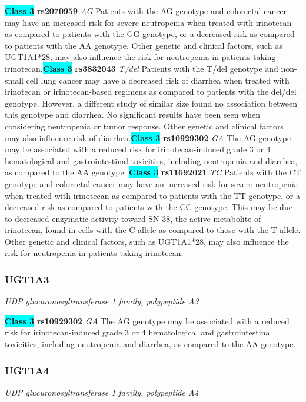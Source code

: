 \documentclass{report}
\begin{document}
\textbf{\colorbox{cyan} {Class 3}} \textbf{ rs2070959 } \textit{ AG }
Patients with the AG genotype and colorectal cancer may have an increased risk for severe neutropenia when treated with irinotecan as compared to patients with the GG genotype, or a decreased risk as compared to patients with the AA genotype. Other genetic and clinical factors, such as UGT1A1*28, may also influence the risk for neutropenia in patients taking irinotecan.\newline\textbf{\colorbox{cyan} {Class 3}} \textbf{ rs3832043 } \textit{ T/del }
Patients with the T/del genotype and non-small cell lung cancer may have a decreased risk of diarrhea when treated with irinotecan or irinotecan-based regimens as compared to patients with the del/del genotype. However, a different study of similar size found no association between this genotype and diarrhea. No significant results have been seen when considering neutropenia or tumor response. Other genetic and clinical factors may also influence risk of diarrhea.\newline\textbf{\colorbox{cyan} {Class 3}} \textbf{ rs10929302 } \textit{ GA }
The AG genotype may be associated with a reduced risk for irinotecan-induced grade 3 or 4 hematological and gastrointestinal toxicities, including neutropenia and diarrhea, as compared to the AA genotype. \newline\textbf{\colorbox{cyan} {Class 3}} \textbf{ rs11692021 } \textit{ TC }
Patients with the CT genotype and colorectal cancer may have an increased risk for severe neutropenia when treated with irinotecan as compared to patients with the TT genotype, or a decreased risk as compared to patients with the CC genotype. This may be due to decreased enzymatic activity toward SN-38, the active metabolite of irinotecan, found in cells with the C allele as compared to those with the T allele. Other genetic and clinical factors, such as UGT1A1*28, may also influence the risk for neutropenia in patients taking irinotecan.\newline\subsubsection{ UGT1A3 }
\textit{ UDP glucuronosyltransferase 1 family, polypeptide A3 }

\textbf{\colorbox{cyan} {Class 3}} \textbf{ rs10929302 } \textit{ GA }
The AG genotype may be associated with a reduced risk for irinotecan-induced grade 3 or 4 hematological and gastrointestinal toxicities, including neutropenia and diarrhea, as compared to the AA genotype. \newline\subsubsection{ UGT1A4 }
\textit{ UDP glucuronosyltransferase 1 family, polypeptide A4 }
\end{document}
